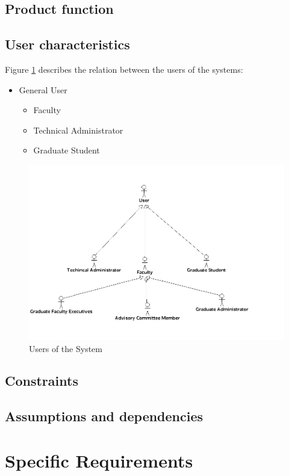 \documentclass[11pt,a4paper]{report}
\begin{document}
\subsection{Product function}
\subsection{User characteristics}
Figure \ref{users} describes the relation between the users of the systems:
\begin{itemize}
\item General User
\begin{itemize}
\item Faculty
\item Technical Administrator
\item Graduate Student
\end{itemize}
\end{itemize}

\begin{figure}[htp]
\centering
\includegraphics[scale=0.40]{diagrams/use_cases/UserHeirachy_uc.png}
\caption{Users of the System}
\label{users}
\end{figure}

\subsection{Constraints}
\subsection{Assumptions and dependencies}

\section{Specific Requirements}
\end{document}
